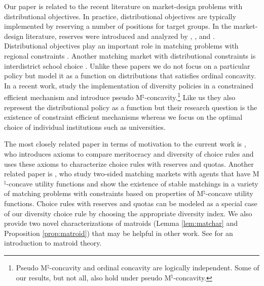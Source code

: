 \documentclass[12pt]{amsart}
\theoremstyle{remark}
\newcommand{\fk}[1]{{\color{red} FK: #1 }}
\newcommand{\mby}[1]{{\color{blue} MBY: #1 }}
\begin{document}
Our paper is related to the recent literature on market-design problems
with distributional objectives. In practice, distributional objectives are
typically implemented by reserving a number of positions for target groups.
In the market-design literature, reserves were introduced and
analyzed by \cite{hayeyi13}, \cite{ehayeyi14}, and \cite{echyen12}.
Distributional objectives play an important role in matching problems with regional
constraints \citep{kamakoji-basic,kamakoji-concepts,kamakoji-iff}.
Another matching market with distributional constraints is interdistrict school choice
\citep{hafalir2022interdistrict}. Unlike these papers we do not focus on a particular policy but
model it as a function on distributions that satisfies ordinal concavity. In a recent work, \cite{hakoye2022} study the
implementation of diversity policies in a constrained efficient mechanism and introduce pseudo
M$^{\natural}$-concavity.\footnote{Pseudo M$^{\natural}$-concavity and ordinal concavity
are logically independent. Some of our results, but not all, also hold under pseudo M$^{\natural}$-concavity.}
Like us they also represent the distributional policy as a function but their research question
is the existence of constraint efficient mechanisms whereas we focus on the optimal choice of individual
institutions such as universities.

The most closely related paper in terms of
motivation to the current work is \cite{imamura2020}, who introduces axioms
to compare meritocracy and diversity of choice rules and uses
these axioms to characterize choice rules with reserves and quotas. Another related paper is
\cite{kojima-tamura-yokoo}, who study two-sided matching markets with agents
that have M$^{\natural}$-concave utility functions and show the existence of
stable matchings in a variety of matching problems with constraints based on properties
of M$^{\natural}$-concave utility functions. Choice rules with reserves and quotas
can be modeled as a special case of our diversity choice rule by choosing the appropriate
diversity index. 
We also provide two novel characterizations
of matroids (Lemma \ref{lem:matchar} and Proposition \ref{prop:matroid})
that may be helpful in other work. See \cite{oxley} for an introduction
to matroid theory.

%
\end{document}
